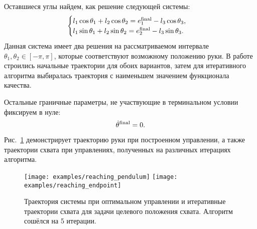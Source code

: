 \documentclass[../../doc.tex]{subfiles}
\begin{document}
    Оставшиеся углы найдем, как решение следующей системы:
    \begin{equation*}
        \begin{cases}
            l_1 \cos \theta_1 + l_2 \cos \theta_2 = e_1^{\textnormal{final}} - l_3 \cos \theta_3,
            \\
            l_1 \sin \theta_1 + l_2 \sin \theta_2 = e_2^{\textnormal{final}} - l_3 \sin \theta_3.
        \end{cases}
    \end{equation*}
    Данная система имеет два решения на рассматриваемом интервале $\theta_1, \theta_2 \in [ -\pi, \pi ]$, которые соответствуют возможному положению руки.
    В работе строились начальные траектории для обоих вариантов, затем для итеративного алгоритма выбиралась траектория с наименьшем значением функционала качества.

    Остальные граничные параметры, не участвующие в терминальном условии фиксируем в нуле:
    \begin{equation*}
        \dot \theta^{\textnormal{final}} = 0.
    \end{equation*}

    Рис.~\ref{fig:reaching-task} демонстрирует траекторию руки при построенном управлении, а также траектории схвата при управлениях, полученных на различных итерациях алгоритма.

    \begin{figure}[h]
        \begin{center}
            \texttt{[image: examples/reaching\_pendulum]}
            \texttt{[image: examples/reaching\_endpoint]}
        \end{center}
        \caption{Траектория системы при оптимальном управлении и итеративные траектории схвата для задачи целевого положения схвата. Алгоритм сошёлся на 5 итерации.}
        \label{fig:reaching-task}
    \end{figure}

    \ifSubfilesClassLoaded{
        \nocite{*}
        \clearpage
        
        
    }{}
\end{document}
